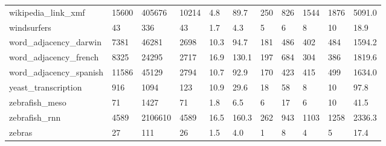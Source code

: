 \begin{longtable}{lllllllllll}
 wikipedia\_link\_xmf                                 & 15600      & 405676    & 10214 & 4.8    & 89.7   & 250   & 826    & 1544   & 1876   & 5091.0  \\
 windsurfers                                        & 43         & 336       & 43    & 1.7    & 4.3    & 5     & 6      & 8      & 10     & 18.9    \\
 word\_adjacency\_darwin                              & 7381       & 46281     & 2698  & 10.3   & 94.7   & 181   & 486    & 402    & 484    & 1594.2  \\
 word\_adjacency\_french                              & 8325       & 24295     & 2717  & 16.9   & 130.1  & 197   & 684    & 304    & 386    & 1819.6  \\
 word\_adjacency\_spanish                             & 11586      & 45129     & 2794  & 10.7   & 92.9   & 170   & 423    & 415    & 499    & 1634.0  \\
 yeast\_transcription                                & 916        & 1094      & 123   & 10.9   & 29.6   & 18    & 58     & 8      & 10     & 97.8    \\
 zebrafish\_meso                                     & 71         & 1427      & 71    & 1.8    & 6.5    & 6     & 17     & 6      & 10     & 41.5    \\
 zebrafish\_rnn                                      & 4589       & 2106610   & 4589  & 16.5   & 160.3  & 262   & 943    & 1103   & 1258   & 2336.3  \\
 zebras                                             & 27         & 111       & 26    & 1.5    & 4.0    & 1     & 8      & 4      & 5      & 17.4    \\
\hline
\end{longtable}